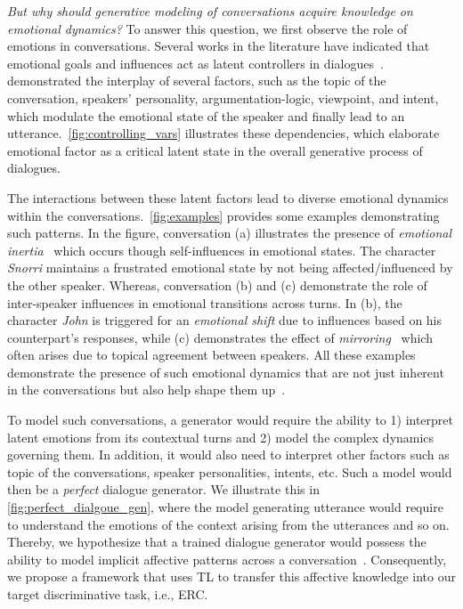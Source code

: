 \documentclass[preprint,3pt]{elsarticle}
\begin{document}
\textit{But why should generative modeling of conversations acquire knowledge on emotional dynamics?} To answer this question, we first observe the role of emotions in conversations. Several works in the literature have indicated that emotional goals and influences act as latent controllers in dialogues~\cite{weigand2017emotions,sidnell2012handbook}. \citet{poria2019emotion} demonstrated the interplay of several factors, such as the topic of the conversation, speakers' personality, argumentation-logic, viewpoint, and intent, which modulate the emotional state of the speaker and finally lead to an utterance.~\cref{fig:controlling_vars} illustrates these dependencies, which elaborate emotional factor as a critical latent state in the overall generative process of dialogues.

The interactions between these latent factors lead to diverse emotional dynamics within the conversations.~\cref{fig:examples} provides some examples demonstrating such patterns. In the figure, conversation (a) illustrates the presence of \textit{emotional inertia}~\cite{koval2012changing} which occurs though self-influences in emotional states. The character \textit{Snorri} maintains a frustrated emotional state by not being affected/influenced by the other speaker. Whereas, conversation (b) and (c) demonstrate the role of inter-speaker influences in emotional transitions across turns. In (b), the character \textit{John} is triggered for an \textit{emotional shift} due to influences based on his counterpart's responses, while (c) demonstrates the effect of \textit{mirroring}~\cite{navarretta2016mirroring} which often arises due to topical agreement between speakers. All these examples demonstrate the presence of such emotional dynamics that are not just inherent in the conversations but also help shape them up~\cite{poria2019emotion}.



To model such conversations, a generator would require the ability to 1) interpret latent emotions from its contextual turns and 2) model the complex dynamics governing them. In addition, it would also need to interpret other factors such as topic of the conversations, speaker personalities, intents, etc. Such a model would then be a \textit{perfect} dialogue generator. We illustrate this in \cref{fig:perfect_dialgoue_gen}, where the model generating utterance  would require to understand the emotions of the context arising from the utterances  and so on. Thereby, we hypothesize that a trained dialogue generator would possess the ability to model implicit affective patterns across a conversation~\cite{shimizu2018pretraining}. Consequently, we propose a framework that uses TL to transfer this affective knowledge into our target discriminative task, i.e., ERC.
\end{document}
